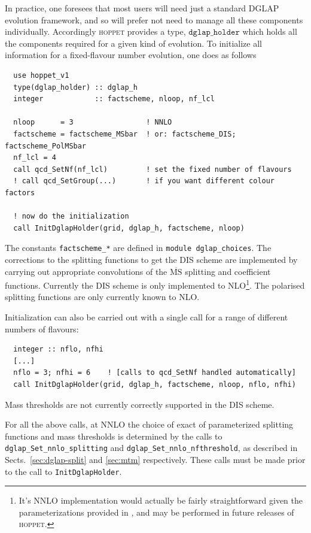 \documentclass[12pt]{article}
\newcommand{\MSbar}{\overline{\mathrm{MS}}}
\newcommand{\hoppet}{\textsc{hoppet}\xspace}
\newcommand{\ttt}[1]{\texttt{#1}}
\begin{document}
In practice, one foresees that most users will need just a standard
DGLAP evolution framework, and so will prefer not need to manage
all these components individually. Accordingly \hoppet provides a
type, $\ttt{dglap\_holder}$ which holds all the components 
required for
a given kind of evolution. To initialize all information for a
fixed-flavour number evolution, one does as follows
%
\begin{lstlisting}
  use hoppet_v1
  type(dglap_holder) :: dglap_h
  integer            :: factscheme, nloop, nf_lcl  

  nloop      = 3                 ! NNLO
  factscheme = factscheme_MSbar  ! or: factscheme_DIS; factscheme_PolMSbar
  nf_lcl = 4
  call qcd_SetNf(nf_lcl)         ! set the fixed number of flavours
  ! call qcd_SetGroup(...)       ! if you want different colour factors

  ! now do the initialization
  call InitDglapHolder(grid, dglap_h, factscheme, nloop)
\end{lstlisting}
The constants \ttt{factscheme\_*} are defined in \ttt{module
  dglap\_choices}. %
The corrections to the splitting functions to get the DIS scheme are
implemented by carrying out appropriate convolutions of the $\MSbar$
splitting and coefficient functions. Currently the DIS scheme is only
implemented to NLO\footnote{It's NNLO implementation would actually be fairly
straightforward given the parameterizations provided in
\cite{White:2005wm}, and may be performed in
future releases of \hoppet.}.
 The polarised splitting functions are only currently known to NLO.

Initialization can also be carried out with a single call for a range of
different numbers of flavours:
\begin{lstlisting}
  integer :: nflo, nfhi
  [...]
  nflo = 3; nfhi = 6    ! [calls to qcd_SetNf handled automatically]
  call InitDglapHolder(grid, dglap_h, factscheme, nloop, nflo, nfhi)
\end{lstlisting}
Mass thresholds are not currently correctly supported in the DIS
scheme.

For all the above calls, at NNLO the choice of exact of parameterized
splitting functions and mass thresholds is determined by the calls to
\ttt{dglap\_Set\_nnlo\_splitting} and
\ttt{dglap\_Set\_nnlo\_nfthreshold}, as described in
Sects.~\ref{sec:dglap-split} and \ref{sec:mtm} respectively. These
calls must be made prior to the call to \ttt{InitDglapHolder}.
\end{document}
